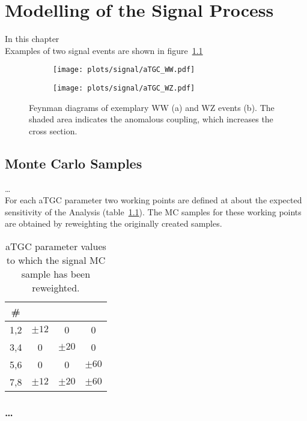 \chapter{Modelling of the Signal Process}
\label{chap:signal}
In this chapter \\
Examples of two signal events are shown in figure~\ref{fig:signal:fy_atgc}

\begin{figure}
	\centering
	\begin{subfigure}{0.49\textwidth}
		\texttt{[image: plots/signal/aTGC\_WW.pdf]}
		\caption{}
	\end{subfigure}
	\begin{subfigure}{0.49\textwidth}
		\texttt{[image: plots/signal/aTGC\_WZ.pdf]}
		\caption{}
	\end{subfigure}	
	\caption[Feynman diagrams of two exemplary signal events]{Feynman diagrams of exemplary WW (a) and WZ events (b). The shaded area indicates the anomalous coupling, which increases the cross section.}
	\label{fig:signal:fy_atgc}
\end{figure}


\section{Monte Carlo Samples}
\dots \\
For each aTGC parameter two working points are defined at about the expected sensitivity of the Analysis (table~\ref{tab:signal:aTGCpoints}). The MC samples for these working points are obtained by reweighting the originally created samples.
\begin{table}
	\centering
	\caption[aTGC working points]{aTGC parameter values to which the signal MC sample has been reweighted.}
	\label{tab:signal:aTGCpoints}
	\begin{tabular}{cccc}
	\hline
	\# & \Tcwww & \Tccw & \Tcb \\
	\hline
	1,2 &  $\pm 12$ & 0 & 0\\
	3,4 & 0 &  $\pm 20$ & 0\\
	5,6 & 0 & 0 &  $\pm 60$\\
	7,8 &	$\pm 12$ & $\pm 20$ & $\pm 60$\\
	\hline
	\end{tabular}
\end{table} 
\subsection{\dots}
